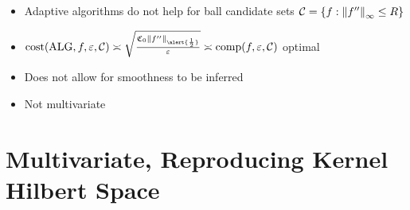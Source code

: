 \documentclass[10pt,compress,xcolor={usenames,dvipsnames},aspectratio=169]{beamer}
\DeclareMathOperator{\alg}{ALG}
\begin{document}
\begin{frame}
\begin{itemize}[<+->]
	\item Adaptive algorithms \alert{do not help for ball} candidate sets 
	$\cc = \{ f : \norm[\infty]{f''} \le R\}$
	
	\item $\cost(\alg,f,\varepsilon,\cc) \asymp \sqrt{\frac{\fC_0 \norm[\alert{\frac 12}]{f''}}{\varepsilon}} \asymp \comp(f,\varepsilon,\cc)$ \alert{ optimal}
	
	\item Does not allow for  \alert{smoothness} to be inferred
	
	\item Not \alert{multivariate}
	
\end{itemize}
	
\end{frame}

\section{Multivariate, Reproducing Kernel Hilbert Space}
\end{document}
